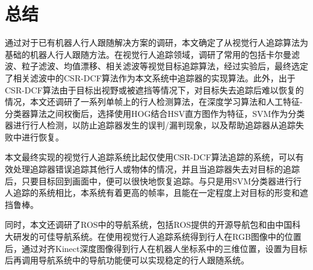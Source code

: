 
\chapter{总结}

  通过对于已有机器人行人跟随解决方案的调研，本文确定了从视觉行人追踪算法为基础的机器人行人跟随方法。在视觉行人追踪领域，调研了常用的包括卡尔曼滤波、粒子滤波、均值漂移、相关滤波等视觉目标追踪算法，经过实验后，最终选定了相关滤波中的CSR-DCF算法作为本文系统中追踪器的实现算法。此外，出于CSR-DCF算法由于目标出视野或被遮挡等情况下，对目标失去追踪后难以恢复的情况，本文还调研了一系列单帧上的行人检测算法，在深度学习算法和人工特征-分类器算法之间权衡后，选择使用HOG结合HSV直方图作为特征，SVM作为分类器进行行人检测，以防止追踪器发生的误判/漏判现象，以及帮助追踪器从追踪失败中进行恢复。

  本文最终实现的视觉行人追踪系统比起仅使用CSR-DCF算法追踪的系统，可以有效处理追踪器错误追踪其他行人或物体的情况，并且当追踪器失去对目标的追踪后，只要目标回到画面中，便可以很快地恢复追踪。与只是用SVM分类器进行行人追踪的系统相比，本系统有着更高的帧率，且能在一定程度上对目标的形变和遮挡鲁棒。

  同时，本文还调研了ROS中的导航系统，包括ROS提供的开源导航包和由中国科大研发的可佳导航系统。在使用视觉行人追踪系统得到行人在RGB图像中的位置后，通过对齐Kinect深度图像得到行人在机器人坐标系中的三维位置，设置为目标后再调用导航系统中的导航功能便可以实现稳定的行人跟随系统。